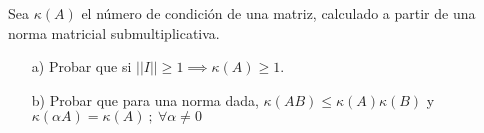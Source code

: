 Sea $\kappa(A)$ el número de condición de una matriz, calculado a partir de una norma matricial submultiplicativa.

\begin{itemize}
    \item[a)] Probar que si $||I|| \geq 1 \implies \kappa(A) \geq 1$.
    \item[b)] Probar que para una norma dada, $\kappa(AB) \leq \kappa(A)\kappa(B)$ y $\kappa(\alpha A) = \kappa(A) ~;~ \forall\alpha\neq 0$
\end{itemize}


